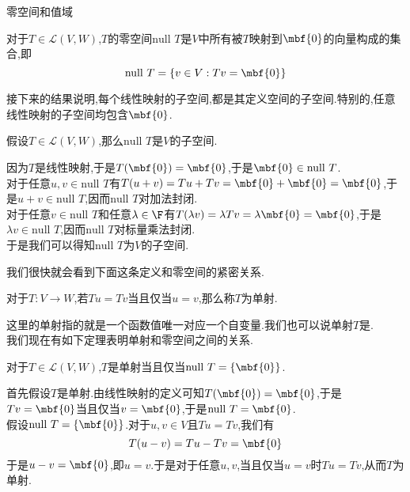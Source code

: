 \documentclass{ctexart}
\begin{document}
\pagestyle{empty}
\begin{center}\large 零空间和值域\end{center}
\begin{definition}[1.1 定义:零空间]
    对于$T\in\mathcal{L}(V,W)$,$T$的零空间$\text{null }T$是$V$中所有被$T$映射到$\mbf{0}$的向量构成的集合,即
    $$\text{null }T=\left\{v\in V:Tv=\mbf{0}\right\}$$
\end{definition}\noindent
接下来的结果说明,每个线性映射的子空间,都是其定义空间的子空间.特别的,任意线性映射的子空间均包含$\mbf{0}$.
\begin{formal}[1.2 零空间是子空间]
    假设$T\in\mathcal{L}(V,W)$,那么$\text{null }T$是$V$的子空间.
\end{formal}
\begin{solution}[Proof.]
    因为$T$是线性映射,于是$T(\mbf{0})=\mbf{0}$,于是$\mbf{0}\in\text{null }T$.\\
    对于任意$u,v\in\text{null }T$有$T(u+v)=Tu+Tv=\mbf{0}+\mbf{0}=\mbf{0}$,于是$u+v\in\text{null }T$,因而$\text{null }T$对加法封闭.\\
    对于任意$v\in\text{null }T$和任意$\lambda\in\F$有$T(\lambda v)=\lambda Tv=\lambda\mbf{0}=\mbf{0}$,于是$\lambda v\in\text{null }T$,因而$\text{null }T$对标量乘法封闭.\\
    于是我们可以得知$\text{null }T$为$V$的子空间.
\end{solution}\noindent
我们很快就会看到下面这条定义和零空间的紧密关系.
\begin{definition}[1.3 定义:单射]
    对于$T:V\to W$,若$Tu=Tv$当且仅当$u=v$,那么称$T$为单射.
\end{definition}\noindent
这里的单射指的就是一个函数值唯一对应一个自变量.我们也可以说单射$T$是.\\
我们现在有如下定理表明单射和零空间之间的关系.
\begin{formal}[1.4 单射与零空间]
    对于$T\in\mathcal{L}(V,W)$,$T$是单射当且仅当$\text{null }T=\left\{\mbf{0}\right\}$.
\end{formal}
\begin{solution}[Proof.]
    首先假设$T$是单射.由线性映射的定义可知$T(\mbf{0})=\mbf{0}$,于是$Tv=\mbf{0}$当且仅当$v=\mbf{0}$,于是$\text{null }T={\mbf{0}}$.\\
    假设$\text{null }T=\left\{\mbf{0}\right\}$.对于$u,v\in V$且$Tu=Tv$,我们有
    $$T(u-v)=Tu-Tv=\mbf{0}$$
    于是$u-v=\mbf{0}$,即$u=v$.于是对于任意$u,v$,当且仅当$u=v$时$Tu=Tv$,从而$T$为单射.
\end{solution}\noindent
{}\\
\end{document}
